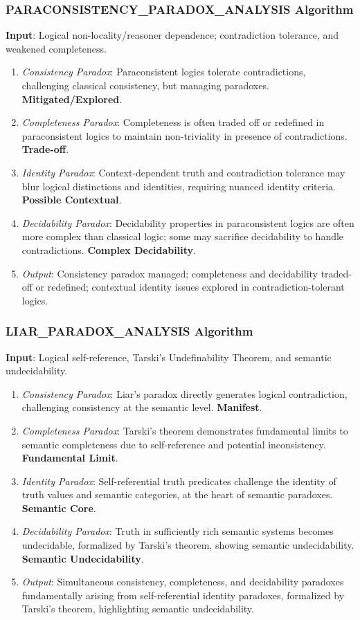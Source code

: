\documentclass{article}
\begin{document}
	\subsubsection{PARACONSISTENCY\_PARADOX\_ANALYSIS Algorithm}
	\textbf{Input}: Logical non-locality/reasoner dependence; contradiction tolerance, and weakened completeness.
	\begin{enumerate}
		\item \textit{Consistency Paradox}: Paraconsistent logics tolerate contradictions, challenging classical consistency, but managing paradoxes. \textbf{Mitigated/Explored}.
		\item \textit{Completeness Paradox}: Completeness is often traded off or redefined in paraconsistent logics to maintain non-triviality in presence of contradictions. \textbf{Trade-off}.
		\item \textit{Identity Paradox}: Context-dependent truth and contradiction tolerance may blur logical distinctions and identities, requiring nuanced identity criteria. \textbf{Possible Contextual}.
		\item \textit{Decidability Paradox}: Decidability properties in paraconsistent logics are often more complex than classical logic; some may sacrifice decidability to handle contradictions. \textbf{Complex Decidability}.
		\item \textit{Output}: Consistency paradox managed; completeness and decidability traded-off or redefined; contextual identity issues explored in contradiction-tolerant logics.
	\end{enumerate}
	
	
	\subsubsection{LIAR\_PARADOX\_ANALYSIS Algorithm}
	\textbf{Input}: Logical self-reference, Tarski's Undefinability Theorem, and semantic undecidability.
	\begin{enumerate}
		\item \textit{Consistency Paradox}: Liar's paradox directly generates logical contradiction, challenging consistency at the semantic level. \textbf{Manifest}.
		\item \textit{Completeness Paradox}: Tarski's theorem demonstrates fundamental limits to semantic completeness due to self-reference and potential inconsistency. \textbf{Fundamental Limit}.
		\item \textit{Identity Paradox}: Self-referential truth predicates challenge the identity of truth values and semantic categories, at the heart of semantic paradoxes. \textbf{Semantic Core}.
		\item \textit{Decidability Paradox}: Truth in sufficiently rich semantic systems becomes undecidable, formalized by Tarski's theorem, showing semantic undecidability. \textbf{Semantic Undecidability}.
		\item \textit{Output}: Simultaneous consistency, completeness, and decidability paradoxes fundamentally arising from self-referential identity paradoxes, formalized by Tarski's theorem, highlighting semantic undecidability.
	\end{enumerate}
	
\end{document}
